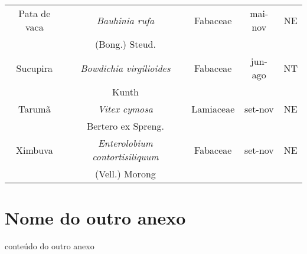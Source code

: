 \begin{anexosenv}
\begin{table}[h]
\begin{tabular}{ccccc}
		Pata de vaca 	 & \textit{Bauhinia rufa}	  				& Fabaceae 		& mai-nov 			& NE 				\\
		&  (Bong.) Steud.							&				&				    &					\\
		
		Sucupira 		 & \textit{Bowdichia virgilioides}		  	& Fabaceae 		& jun-ago 			& NT 				\\
		& Kunth									&				&				    &					\\
		
		Tarumã           & \textit{Vitex cymosa}	 				& Lamiaceae 	& set-nov 			& NE 				\\
		&  Bertero ex Spreng.						& 				&					&					\\
		
		Ximbuva 		 & \textit{Enterolobium contortisiliquum}	& Fabaceae 		& set-nov 			& NE 				\\
		&  (Vell.) Morong 							&				&					&					\\
		\hline
	\end{tabular}
\end{table}
\chapter{Nome do outro anexo}
\label{chap:anexoB}

conteúdo do outro anexo

\end{anexosenv}
